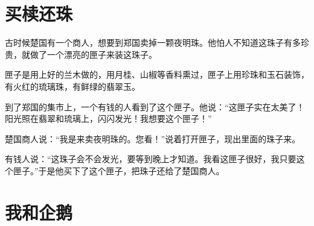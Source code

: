 \documentclass[12pt,UTF-8,openany]{ctexbook}
\begin{document}
\chapter{买椟还珠}

\begin{Large}
    
    古时候楚国有一个商人，想要到郑国卖掉一颗夜明珠。他怕人不知道这珠子有多珍贵，就做了一个漂亮的匣子来装这珠子。
    
    匣子是用上好的兰木做的，用月桂、山椒等香料熏过，匣子上用珍珠和玉石装饰，有火红的琉璃珠，有鲜绿的翡翠玉。
    
    到了郑国的集市上，一个有钱的人看到了这个匣子。他说：“这匣子实在太美了！阳光照在翡翠和琉璃上，闪闪发光！我想要这个匣子！”
    
    楚国商人说：“我是来卖夜明珠的。您看！”说着打开匣子，现出里面的珠子来。
    
    有钱人说：“这珠子会不会发光，要等到晚上才知道。我看这匣子很好，我只要这个匣子。”于是他买下了这个匣子，把珠子还给了楚国商人。
    
\end{Large}

\chapter{我和企鹅}
\end{document}
